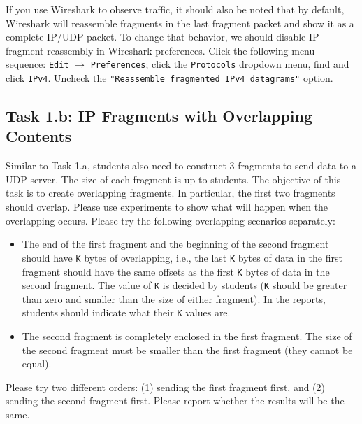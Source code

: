 If you use Wireshark to observe traffic, it should also be noted that by default, 
Wireshark will reassemble fragments in the last fragment packet and
show it as a complete IP/UDP packet. To change that behavior,
we should disable IP fragment reassembly in Wireshark preferences.
Click the following menu sequence: \texttt{Edit} $\rightarrow$ \texttt{Preferences}; 
click the \texttt{Protocols} dropdown menu, find and click \texttt{IPv4}.
Uncheck the \texttt{"Reassemble fragmented IPv4 datagrams"} option. 






\subsection{Task 1.b: IP Fragments with Overlapping Contents}

Similar to Task 1.a, students also need to construct 3 fragments to send data to a UDP server.
The size of each fragment is up to students.  The objective of this task is to create
overlapping fragments.  In particular, the first two fragments should overlap.  Please use
experiments to show what will happen when the overlapping occurs. Please
try the following overlapping scenarios separately:
 
 \begin{itemize} 
 \item The end of the first fragment and the beginning of the second
 fragment should have \texttt{K} bytes of overlapping, i.e., the last  
 \texttt{K} bytes of data in the first fragment should have the same
 offsets as the first \texttt{K} bytes of data in the second fragment. 
 The value of \texttt{K} is decided by students (\texttt{K} should be 
 greater than zero and smaller than the size of either fragment). In the reports, students
 should indicate what their \texttt{K} values are. 


 \item The second fragment is completely enclosed in the first fragment.
 The size of the second fragment must be smaller than the 
 first fragment (they cannot be equal).

 \end{itemize} 


Please try two different orders: (1) sending the first fragment first, and 
(2) sending the second fragment first. Please report whether the results will
be the same. 





